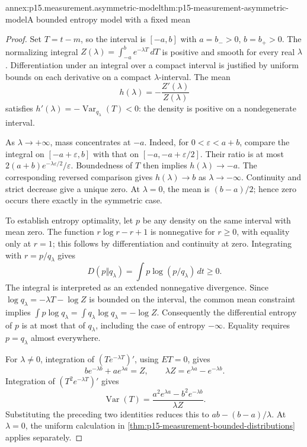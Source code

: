 \begin{annexitem}{annex:p15.measurement.asymmetric-model}{thm:p15-measurement-asymmetric-model}{A bounded entropy model with a fixed mean}
\begin{proof}
Set \(T=t-m\), so the interval is \([-a,b]\) with \(a=b_->0\),
\(b=b_+>0\). The normalizing integral
\(Z(\lambda)=\int_{-a}^b e^{-\lambda T}\,dT\) is positive and smooth
for every real \(\lambda\). Differentiation under an integral over a
compact interval is justified by uniform bounds on each derivative on a
compact \(\lambda\)-interval. The mean
\[
 h(\lambda)=-\frac{Z'(\lambda)}{Z(\lambda)}
\]
satisfies \(h'(\lambda)=-\operatorname{Var}_{q_\lambda}(T)<0\):
the density is positive on a nondegenerate interval.

As \(\lambda\to+\infty\), mass concentrates at \(-a\).
Indeed, for \(0<\varepsilon<a+b\), compare the integral on
\([-a+\varepsilon,b]\) with that on
\([-a,-a+\varepsilon/2]\). Their ratio is at most
\(2(a+b)e^{-\lambda\varepsilon/2}/\varepsilon\).
Boundedness of \(T\) then implies \(h(\lambda)\to-a\).
The corresponding reversed comparison gives \(h(\lambda)\to b\)
as \(\lambda\to-\infty\). Continuity and strict decrease give a unique
zero. At \(\lambda=0\), the mean is \((b-a)/2\); hence zero occurs there
exactly in the symmetric case.

To establish entropy optimality, let \(p\) be any density on the same
interval with mean zero. The function \(r\log r-r+1\) is nonnegative
for \(r\geq0\), with equality only at \(r=1\); this follows by
differentiation and continuity at zero. Integrating with \(r=p/q_\lambda\)
gives
\[
 D(p\Vert q_\lambda)=\int p\log(p/q_\lambda)\,dt\geq0.
\]
The integral is interpreted as an extended nonnegative divergence.
Since \(\log q_\lambda=-\lambda T-\log Z\) is bounded on the interval,
the common mean constraint implies
\(\int p\log q_\lambda=\int q_\lambda\log q_\lambda=-\log Z\).
Consequently the differential entropy of \(p\) is at most that of
\(q_\lambda\), including the case of entropy \(-\infty\).
Equality requires \(p=q_\lambda\) almost everywhere.

For \(\lambda\ne0\), integration of
\((T e^{-\lambda T})'\), using \(ET=0\), gives
\[
 b e^{-\lambda b}+a e^{\lambda a}=Z,\qquad
 \lambda Z=e^{\lambda a}-e^{-\lambda b}.
\]
Integration of \((T^2e^{-\lambda T})'\) gives
\[
 \operatorname{Var}(T)=
 \frac{a^2e^{\lambda a}-b^2e^{-\lambda b}}{\lambda Z}.
\]
Substituting the preceding two identities reduces this to
\(ab-(b-a)/\lambda\). At \(\lambda=0\), the uniform calculation
in \cref{thm:p15-measurement-bounded-distributions} applies separately.
\end{proof}
\end{annexitem}

